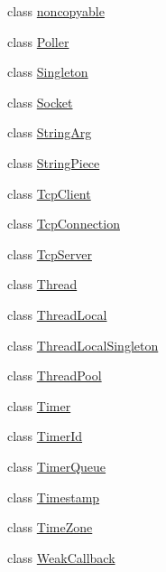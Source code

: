 \begin{DoxyCompactItemize}
\item 
class \hyperlink{classmuduo_1_1noncopyable}{noncopyable}
\item 
class \hyperlink{classmuduo_1_1Poller}{Poller}
\item 
class \hyperlink{classmuduo_1_1Singleton}{Singleton}
\item 
class \hyperlink{classmuduo_1_1Socket}{Socket}
\item 
class \hyperlink{classmuduo_1_1StringArg}{String\+Arg}
\item 
class \hyperlink{classmuduo_1_1StringPiece}{String\+Piece}
\item 
class \hyperlink{classmuduo_1_1TcpClient}{Tcp\+Client}
\item 
class \hyperlink{classmuduo_1_1TcpConnection}{Tcp\+Connection}
\item 
class \hyperlink{classmuduo_1_1TcpServer}{Tcp\+Server}
\item 
class \hyperlink{classmuduo_1_1Thread}{Thread}
\item 
class \hyperlink{classmuduo_1_1ThreadLocal}{Thread\+Local}
\item 
class \hyperlink{classmuduo_1_1ThreadLocalSingleton}{Thread\+Local\+Singleton}
\item 
class \hyperlink{classmuduo_1_1ThreadPool}{Thread\+Pool}
\item 
class \hyperlink{classmuduo_1_1Timer}{Timer}
\item 
class \hyperlink{classmuduo_1_1TimerId}{Timer\+Id}
\item 
class \hyperlink{classmuduo_1_1TimerQueue}{Timer\+Queue}
\item 
class \hyperlink{classmuduo_1_1Timestamp}{Timestamp}
\item 
class \hyperlink{classmuduo_1_1TimeZone}{Time\+Zone}
\item 
class \hyperlink{classmuduo_1_1WeakCallback}{Weak\+Callback}
\end{DoxyCompactItemize}
